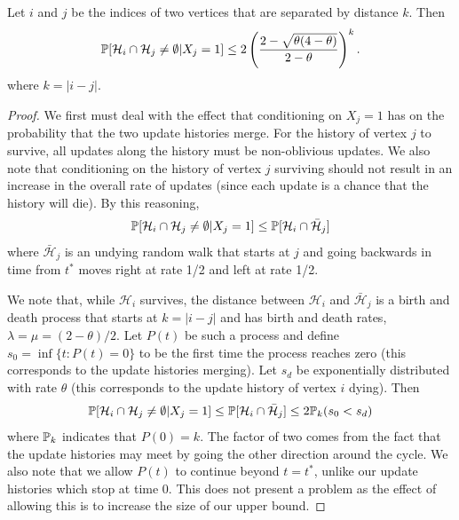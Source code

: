 \begin{lemma}
	\label{lem:A_ij bound conditioned}
		Let $i$ and $j$ be the indices of two vertices that are separated by distance $k$. Then
		\begin{equation}
			\mathbb{P}[\mathcal{H}_i \cap \mathcal{H}_j \neq \emptyset|X_{j} = 1] \leq 2\left(\frac{2 - \sqrt{\theta(4 - \theta)}}{2 - \theta}\right)^k.
		\end{equation}
		where $k = |i - j|$.
	\end{lemma}
	\begin{proof}
		We first must deal with the effect that conditioning on $X_j = 1$ has on the probability that the two update histories merge. For the history of vertex $j$ to survive, all updates along the history must be non-oblivious updates. We also note that conditioning on the history of vertex $j$ surviving should not result in an increase in the overall rate of updates (since each update is a chance that the history will die). By this reasoning, 
		\begin{equation}
			\mathbb{P}[\mathcal{H}_i \cap \mathcal{H}_j \neq \emptyset | X_j = 1] \leq \mathbb{P}[\mathcal{H}_i \cap \bar{\mathcal{H}}_j]
		\end{equation}
		where $\bar{\mathcal{H}}_j$ is an undying random walk that starts at $j$ and going backwards in time from $t^*$ moves right at rate 1/2 and left at rate 1/2.

		We note that, while $\mathcal{H}_i$ survives, the distance between $\mathcal{H}_i$ and $\bar{\mathcal{H}}_j$ is a birth and death process that starts at $k = |i - j|$ and has birth and death rates, $\lambda = \mu = (2 - \theta)/2$. Let $P(t)$ be such a process and define $s_0  = \inf\{t : P(t) = 0\}$ to be the first time the process reaches zero (this corresponds to the update histories merging). Let $s_d$ be exponentially distributed with rate $\theta$ (this corresponds to the update history of vertex $i$ dying). Then
		\begin{align}
		 	\mathbb{P}[\mathcal{H}_i \cap \mathcal{H}_j \neq \emptyset | X_j = 1] \leq \mathbb{P}[\mathcal{H}_i \cap \bar{\mathcal{H}}_j] \leq 2 \mathbb{P}_k(s_0 < s_d)
		 \end{align} 
		 where $\mathbb{P}_k$ indicates that $P(0) = k$. 
		 The factor of two comes from the fact that the update histories may meet by going the other direction around the cycle. We also note that we allow $P(t)$ to continue beyond $t = t^*$, unlike our update histories which stop at time $0$. This does not present a problem as the effect of allowing this is to increase the size of our upper bound.


\end{proof}
